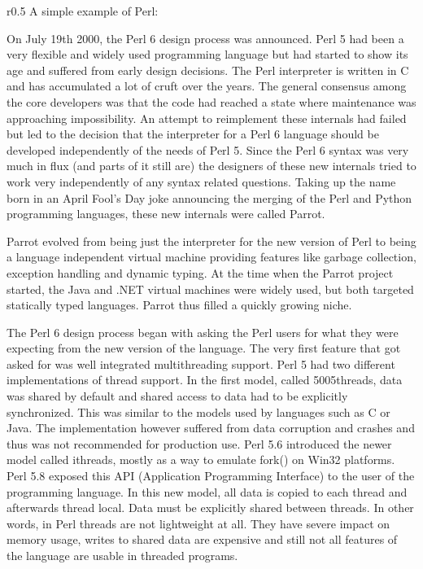 \documentclass[bachelor,english]{hgbthesis}
\begin{document}
\begin{wrapfigure}{r}{0.5\textwidth}
A simple example of Perl:

\end{wrapfigure}
%
On July 19th 2000, the Perl 6 design process was announced. Perl 5 had been a very flexible and widely used programming language but had started to show its age and suffered from early design decisions. The Perl interpreter is written in C and has accumulated a lot of cruft over the years. The general consensus among the core developers was that the code had reached a state where maintenance was approaching impossibility\cite{Masak40451}. An attempt to reimplement these internals had failed but led to the decision that the interpreter for a Perl 6 language should be developed independently of the needs of Perl 5. Since the Perl 6 syntax was very much in flux (and parts of it still are) the designers of these new internals tried to work very independently of any syntax related questions\cite{Developer}. Taking up the name born in an April Fool's Day joke announcing the merging of the Perl and Python programming languages, these new internals were called Parrot\cite{Perl}.

Parrot evolved from being just the interpreter for the new version of Perl to being a language independent virtual machine providing features like garbage collection, exception handling and dynamic typing. At the time when the Parrot project started, the Java and .NET virtual machines were widely used, but both targeted statically typed languages. Parrot thus filled a quickly growing niche.

The Perl 6 design process began with asking the Perl users for what they were expecting from the new version of the language. The very first feature that got asked for was well integrated multithreading support\cite{RFC1}. Perl 5 had two different implementations of thread support. In the first model, called 5005threads, data was shared by default and shared access to data had to be explicitly synchronized. This was similar to the models used by languages such as C or Java. The implementation however suffered from data corruption and crashes and thus was not recommended for production use\cite{ThreadManual}. Perl 5.6 introduced the newer model called ithreads, mostly as a way to emulate fork() on Win32 platforms. Perl 5.8 exposed this API (Application Programming Interface) to the user of the programming language. In this new model, all data is copied to each thread and afterwards thread local. Data must be explicitly shared between threads. In other words, in Perl threads are not lightweight at all. They have severe impact on memory usage, writes to shared data are expensive and still not all features of the language are usable in threaded programs.
\end{document}
